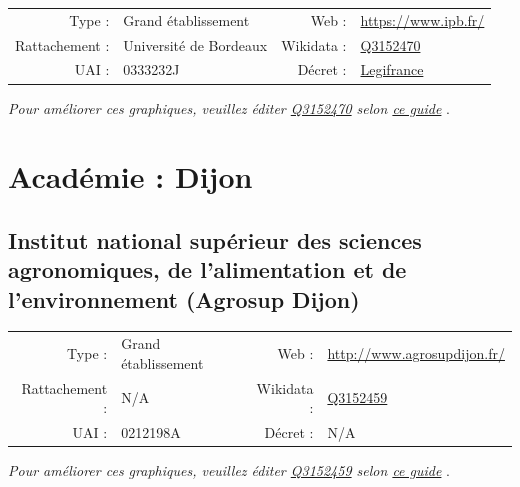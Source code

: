 \documentclass[11pt,french,landscape]{article}
\begin{document}
\begin{tabular*}{0.45\textwidth}{rp{2cm}rl}  
\hline  
Type : & Grand établissement & Web : &\href{https://www.ipb.fr/}{https://www.ipb.fr/} \\  
Rattachement : & Université de Bordeaux & Wikidata : & \href{https://www.wikidata.org/entity/Q3152470}{Q3152470} \\  
UAI : & 0333232J & Décret : & \href{http://legifrance.gouv.fr/affichTexte.do?cidTexte=JORFTEXT000030820446&dateTexte=&categorieLien=id}{Legifrance} \\  
\hline  
\end{tabular*}

\textit{\scriptsize Pour améliorer ces graphiques, veuillez éditer \href{https://www.wikidata.org/entity/Q3152470}{Q3152470}  selon \href{https://github.com/cpesr/wikidataESR/blob/master/Rmd/wikidataESR.md}{ce guide}}
.


\newpage

\hypertarget{acaduxe9mie-dijon-1}{%
\section{Académie : Dijon}\label{acaduxe9mie-dijon-1}}

\hypertarget{institut-national-supuxe9rieur-des-sciences-agronomiques-de-lalimentation-et-de-lenvironnement-agrosup-dijon}{%
\subsection{Institut national supérieur des sciences agronomiques, de
l'alimentation et de l'environnement (Agrosup
Dijon)}\label{institut-national-supuxe9rieur-des-sciences-agronomiques-de-lalimentation-et-de-lenvironnement-agrosup-dijon}}

\begin{tabular*}{0.45\textwidth}{rp{2cm}rl}  
\hline  
Type : & Grand établissement & Web : &\href{http://www.agrosupdijon.fr/}{http://www.agrosupdijon.fr/} \\  
Rattachement : & N/A & Wikidata : & \href{https://www.wikidata.org/entity/Q3152459}{Q3152459} \\  
UAI : & 0212198A & Décret : & N/A \\  
\hline  
\end{tabular*}

\textit{\scriptsize Pour améliorer ces graphiques, veuillez éditer \href{https://www.wikidata.org/entity/Q3152459}{Q3152459}  selon \href{https://github.com/cpesr/wikidataESR/blob/master/Rmd/wikidataESR.md}{ce guide}}
.
\end{document}
